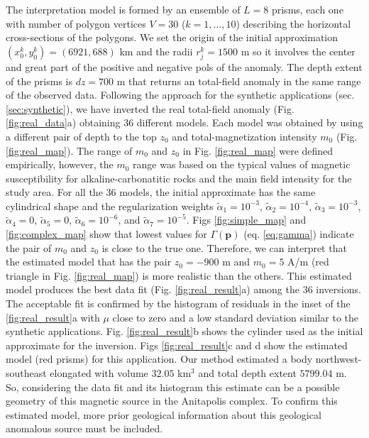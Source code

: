 The interpretation model is formed by an ensemble of $L = 8$ prisms, each one with number of polygon vertices $V = 30$ ($k = 1, \dots , 10$) describing the horizontal cross-sections of the polygons. We set the origin of the initial approximation $(x_0^k, y_0^k) = (6921, 688)$ km and the radii $r_j^k = 1500$ m so it involves the center and great part of the positive and negative pols of the anomaly. The depth extent of the prisms is $dz = 700$ m that returns an total-field anomaly in the same range of the observed data. Following the approach for the synthetic applications (sec. \ref{sec:synthetic}), we have inverted the real total-field anomaly (Fig. \ref{fig:real_data}a) obtaining 36 different models. Each model was obtained by using a different pair of depth to the top $z_0$ and total-magnetization intensity $m_0$ (Fig. \ref{fig:real_map}). The range of $m_0$ and $z_0$ in Fig. \ref{fig:real_map} were defined empirically, however, the $m_0$ range was based on the typical values of magnetic susceptibility for alkaline-carbonatitic rocks and the main field intensity for the study area. For all the 36 models, the initial approximate has the same cylindrical shape and the regularization weights $\tilde{\alpha}_1 = 10^{-3}$, $\tilde{\alpha}_2 = 10^{-4}$, $\tilde{\alpha}_3 = 10^{-3}$, $\tilde{\alpha}_4 = 0$, $\tilde{\alpha}_5 = 0$, $\tilde{\alpha}_6 = 10^{-6}$, and $\tilde{\alpha}_7 = 10^{-5}$. Figs \ref{fig:simple_map} and \ref{fig:complex_map} show that lowest values for $\Gamma(\mathbf{p})$ (eq. \ref{eq:gamma}) indicate the pair of $m_0$ and $z_0$ is close to the true one. Therefore, we can interpret that the estimated model that has the pair $z_0 = -900$ m and $m_0 = 5$ A/m (red triangle in Fig. \ref{fig:real_map}) is more realistic than the others. This estimated model produces the best data fit (Fig. \ref{fig:real_result}a) among the 36 inversions. The acceptable fit is confirmed by the histogram of residuals in the inset of the \ref{fig:real_result}a with $ \mu $ close to zero and a low standard deviation similar to the synthetic applications. Fig. \ref{fig:real_result}b shows the cylinder used as the initial approximate for the inversion. Figs \ref{fig:real_result}c and d show the estimated model (red prisms) for this application. Our method estimated a body northwest-southeast elongated with volume $ 32.05 $ km$ ^3 $ and total depth extent $ 5799.04 $ m. So, considering the data fit and its histogram this estimate can be a possible geometry of this magnetic source in the Anitapolis complex. To confirm this estimated model, more prior geological information about this geological anomalous source must be included.